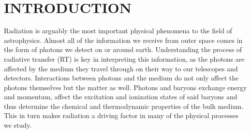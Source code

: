 \documentclass[fleq,usenatbib]{mnras}
\begin{document}
\section{INTRODUCTION}\label{sec:intr}
Radiation is arguably the most important physical phenomena to the field of
astrophysics. Almost all of the information we receive from outer space comes 
in the form of photons we detect on or around earth. Understanding the process 
of radiative transfer (RT) is key in interpreting this information, as the 
photons are affected by the medium they travel through on their way to our 
telescopes and detectors. Interactions between photons and the medium do not 
only affect the photons themselves but the matter as well. Photons and baryons 
exchange energy and momentum, affect the excitation and ionization states of 
said baryons and thus determine the chemical and thermodynamic properties of 
the bulk medium. This in turn makes radiation a driving factor in many of the 
physical processes we study.
\end{document}

